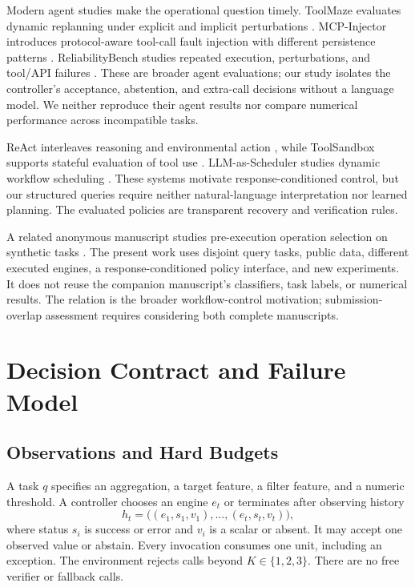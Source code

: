 \documentclass{svproc}
\begin{document}
Modern agent studies make the operational question timely. ToolMaze evaluates dynamic replanning under explicit and implicit perturbations \cite{toolmaze2026}. MCP-Injector introduces protocol-aware tool-call fault injection with different persistence patterns \cite{mcp2026}. ReliabilityBench studies repeated execution, perturbations, and tool/API failures \cite{reliability2026}. These are broader agent evaluations; our study isolates the controller's acceptance, abstention, and extra-call decisions without a language model. We neither reproduce their agent results nor compare numerical performance across incompatible tasks.

ReAct interleaves reasoning and environmental action \cite{yao2023react}, while ToolSandbox supports stateful evaluation of tool use \cite{lu2025toolsandbox}. LLM-as-Scheduler studies dynamic workflow scheduling \cite{xiang2026scheduler}. These systems motivate response-conditioned control, but our structured queries require neither natural-language interpretation nor learned planning. The evaluated policies are transparent recovery and verification rules.

A related anonymous manuscript studies pre-execution operation selection on synthetic tasks \cite{relatedSubmission}. The present work uses disjoint query tasks, public data, different executed engines, a response-conditioned policy interface, and new experiments. It does not reuse the companion manuscript's classifiers, task labels, or numerical results. The relation is the broader workflow-control motivation; submission-overlap assessment requires considering both complete manuscripts.

\section{Decision Contract and Failure Model}
\subsection{Observations and Hard Budgets}
A task $q$ specifies an aggregation, a target feature, a filter feature, and a numeric threshold. A controller chooses an engine $e_t$ or terminates after observing history
\begin{equation}
h_t=\bigl((e_1,s_1,v_1),\ldots,(e_t,s_t,v_t)\bigr),
\end{equation}
where status $s_i$ is success or error and $v_i$ is a scalar or absent. It may accept one observed value or abstain. Every invocation consumes one unit, including an exception. The environment rejects calls beyond $K\in\{1,2,3\}$. There are no free verifier or fallback calls.
\end{document}
